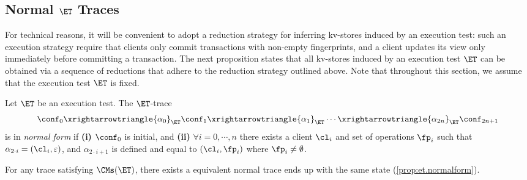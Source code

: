 \subsection{Normal \( \ET \) Traces}
\label{sec:normal-form-exist}
For technical reasons, it will be convenient to adopt a reduction strategy for inferring kv-stores induced by an 
execution test: such an execution strategy require that clients only commit transactions with non-empty fingerprints, 
and a client updates its view only immediately before committing a transaction. 
The next proposition states that all kv-stores induced by an execution test $\ET$ can be 
obtained via a sequence of reductions that adhere to the reduction strategy outlined above. 
Note that throughout this section, we assume that the execution test $\ET$ is fixed.

\begin{definition}
Let $\ET$ be an execution test. The $\ET$-trace
\[
\conf_0 \xrightarrowtriangle{\alpha_0}_{\ET} \conf_1 \xrightarrowtriangle{\alpha_1}_{\ET} \cdots \xrightarrowtriangle{\alpha_{2n}}_{\ET} \conf_{2n + 1}
\]
is in \emph{normal form} if \textbf{(i)} $\conf_0$ is initial, and 
\textbf{(ii)} $\forall i=0,\cdots, n$ there exists a client $\cl_i$ and set of operations $\fp_{i}$ such that 
$\alpha_{2 \cdot i} = (\cl_{i}, \varepsilon)$, and $\alpha_{2 \cdot i + 1}$ is defined and equal to $(\cl_{i}, \fp_{i})$ where \( \fp_i \neq \emptyset \).
\end{definition}

For any trace satisfying \( \CMs(\ET) \), 
there exists a equivalent normal trace ends up with the same state (\cref{prop:et.normalform}).

